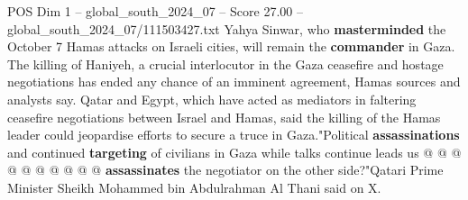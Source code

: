 \begin{textsample}{POS Dim 1 – global\_south\_2024\_07 – Score 27.00 – global\_south\_2024\_07/111503427.txt}
Yahya Sinwar, who \textbf{masterminded} the October 7 Hamas attacks on Israeli cities, will remain the \textbf{commander} in Gaza.
The killing of Haniyeh, a crucial interlocutor in the Gaza ceasefire and hostage negotiations has ended any chance of an imminent agreement, Hamas sources and analysts say.
Qatar and Egypt, which have acted as mediators in faltering ceasefire negotiations between Israel and Hamas, said the killing of the Hamas leader could jeopardise efforts to secure a truce in Gaza."Political \textbf{assassinations} and continued \textbf{targeting} of civilians in Gaza while talks continue leads us @ @ @ @ @ @ @ @ @ @ \textbf{assassinates} the negotiator on the other side?"Qatari Prime Minister Sheikh Mohammed bin Abdulrahman Al Thani said on X.

\end{textsample}
